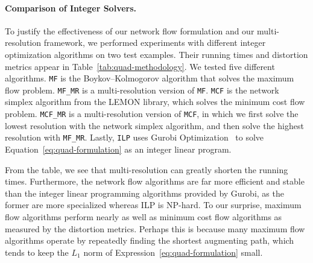 \paragraph*{Comparison of Integer Solvers.} To justify the effectiveness of our network flow formulation and our multi-resolution framework, we performed experiments with different integer optimization algorithms on two test examples. Their running times and distortion metrics appear in Table~\ref{tab:quad-methodology}. We tested five different algorithms. \texttt{MF} is the Boykov--Kolmogorov algorithm that solves the maximum flow problem. \texttt{MF\_MR} is a multi-resolution version of \texttt{MF}. \texttt{MCF} is the network simplex algorithm from the LEMON library, which solves the minimum cost flow problem. \texttt{MCF\_MR} is a multi-resolution version of \texttt{MCF}, in which we first solve the lowest resolution with the network simplex algorithm, and then solve the highest resolution with \texttt{MF\_MR}. Lastly, \texttt{ILP} uses Gurobi Optimization~\cite{gurobi} to solve Equation~\eqref{eq:quad-formulation} as an integer linear program.

From the table, we see that multi-resolution can greatly shorten the running times. Furthermore, the network flow algorithms are far more efficient and stable than the integer linear programming algorithms provided by Gurobi, as the former are more specialized whereas ILP is NP-hard. To our surprise, maximum flow algorithms perform nearly as well as minimum cost flow algorithms as measured by the distortion metrics.  Perhaps this is because many maximum flow algorithms operate by repeatedly finding the shortest augmenting path, which tends to keep the $L_1$ norm of Expression~\eqref{eq:quad-formulation} small.

